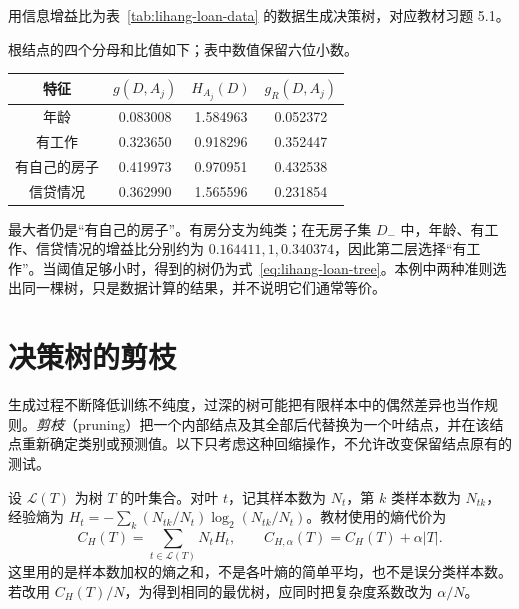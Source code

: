\begin{example}
\label{ex:lihang-loan-c45}
用信息增益比为表~\ref{tab:lihang-loan-data} 的数据生成决策树，对应教材习题 5.1。
\end{example}
\begin{solve}
根结点的四个分母和比值如下；表中数值保留六位小数。
\begin{center}
  \begin{tabular}{cccc}
    \toprule
    特征 & $g(D,A_j)$ & $H_{A_j}(D)$ & $g_R(D,A_j)$ \\
    \midrule
    年龄 & 0.083008 & 1.584963 & 0.052372 \\
    有工作 & 0.323650 & 0.918296 & 0.352447 \\
    有自己的房子 & 0.419973 & 0.970951 & 0.432538 \\
    信贷情况 & 0.362990 & 1.565596 & 0.231854 \\
    \bottomrule
  \end{tabular}
\end{center}
最大者仍是“有自己的房子”。有房分支为纯类；在无房子集 $D_-$ 中，年龄、有工作、信贷情况的增益比分别约为 $0.164411,1,0.340374$，因此第二层选择“有工作”。当阈值足够小时，得到的树仍为式~\eqref{eq:lihang-loan-tree}。本例中两种准则选出同一棵树，只是数据计算的结果，并不说明它们通常等价。
\end{solve}

\section{决策树的剪枝}
\label{sec:lihang-tree-pruning}

生成过程不断降低训练不纯度，过深的树可能把有限样本中的偶然差异也当作规则。\emph{剪枝}（pruning）把一个内部结点及其全部后代替换为一个叶结点，并在该结点重新确定类别或预测值。以下只考虑这种回缩操作，不允许改变保留结点原有的测试。

设 $\mathcal L(T)$ 为树 $T$ 的叶集合。对叶 $t$，记其样本数为 $N_t$，第 $k$ 类样本数为 $N_{tk}$，经验熵为 $H_t=-\sum_k(N_{tk}/N_t)\log_2(N_{tk}/N_t)$。教材使用的熵代价为
\begin{equation}
  C_H(T)=\sum_{t\in\mathcal L(T)}N_tH_t,
  \qquad C_{H,\alpha}(T)=C_H(T)+\alpha|T|.
  \label{eq:lihang-tree-entropy-cost}
\end{equation}
这里用的是样本数加权的熵之和，不是各叶熵的简单平均，也不是误分类样本数。若改用 $C_H(T)/N$，为得到相同的最优树，应同时把复杂度系数改为 $\alpha/N$。

